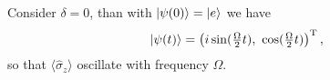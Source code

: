 Consider $\delta=0$, than with $\left| \psi(0) \right\rangle = \left| e \right\rangle$ we have
\begin{equation*}
	\left| \psi(t) \right\rangle = \left(i \sin(\tfrac{\Omega}{2}t),\ \cos(\tfrac{\Omega}{2}t)\right)^{\textnormal{T}},
\end{equation*}
so that $\langle \hat{\sigma}_z\rangle$ oscillate with frequency $\Omega$.